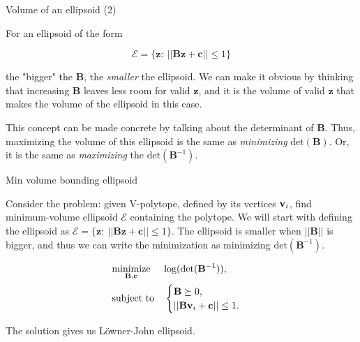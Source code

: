 \documentclass{beamer}
\begin{document}
\begin{frame}{Volume of an ellipsoid (2)}
\begin{flushleft}

For an ellipsoid of the form

\begin{equation}
    \mathcal{E} = \{ \mathbf{z}: \ || \mathbf{B}\mathbf{z} + \mathbf{c} || \leq 1 \}
\end{equation}

the "bigger" the $\mathbf{B}$, the \emph{smaller} the ellipsoid. We can make it obvious by thinking that increasing $\mathbf{B}$ leaves less room for valid $\mathbf{z}$, and it is the volume of valid $\mathbf{z}$ that makes the volume of the ellipsoid in this case.

\bigskip

This concept can be made concrete by talking about the determinant of $\mathbf{B}$. Thus, maximizing the volume of this ellipsoid is the same as \emph{minimizing} $\text{det}(\mathbf{B})$. Or, it is the same as \emph{maximizing} the $\text{det}(\mathbf{B}^{-1})$.
 
\end{flushleft}
\end{frame}


\begin{frame}{Min volume bounding ellipsoid}
	\begin{flushleft}
		
		Consider the problem: given V-polytope, defined by its vertices $\mathbf{v}_i$, find minimum-volume ellipsoid $\mathcal{E}$ containing the polytope. We will start with defining the ellipsoid as $\mathcal{E} = \{ \mathbf{z}: \ || \mathbf{B}\mathbf{z} + \mathbf{c} || \leq 1 \}$. The ellipsoid is smaller when $|| \mathbf{B} ||$ is bigger, and thus we can write the minimization as minimizing $\text{det} (\mathbf{B}^{-1}) $.
		
\begin{equation}
	\begin{aligned}
		& \underset{\mathbf{B}, \mathbf{c}}{\text{minimize}}
		& & \text{log} (\text{det} (\mathbf{B}^{-1}) ), \\
		& \text{subject to}
		& & \begin{cases}
			\mathbf{B} \succeq 0, \\
			|| \mathbf{B} \mathbf{v}_i + \mathbf{c} || \leq 1.
		\end{cases}
	\end{aligned}
\end{equation}

The solution gives us L\"owner-John ellipsoid.
		
	\end{flushleft}
\end{frame}
\end{document}
